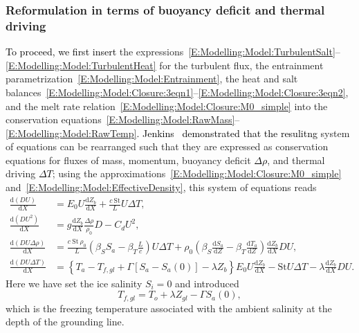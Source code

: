 \documentclass[openacc]{rsproca_new}%
\newcommand{\dd}[2]{\frac{\mathrm{d} #1}{\mathrm{d} #2}}
\newcommand{\red}[1]{{\color{red} #1}}
\newcommand{\blue}[1]{{\color{blue} #1}}
\newcommand{\rout}[1]{\red{\st{#1}}}\newcommand{\ab}[1]{\textcolor{Green}{#1}}\newcommand{\about}[1]{\textcolor{Cyan}{\sout{#1}}}
\renewcommand{\rout}[1]{{}} %
\renewcommand{\blue}[1]{{\textcolor{black}{#1}}} %
\renewcommand{\red}[1]{{}} %
\begin{document}
\subsubsection{Reformulation in terms of buoyancy deficit and thermal driving}
\blue{To proceed, we first insert}\rout{Inserting} the expressions~\eqref{E:Modelling:Model:TurbulentSalt}--\eqref{E:Modelling:Model:TurbulentHeat} for the turbulent flux, the entrainment parametrization~\eqref{E:Modelling:Model:Entrainment}, the heat and salt balances~\eqref{E:Modelling:Model:Closure:3eqn1}--\eqref{E:Modelling:Model:Closure:3eqn2}, and the melt rate relation~\eqref{E:Modelling:Model:Closure:M0_simple} into the conservation equations~\eqref{E:Modelling:Model:RawMass}--\eqref{E:Modelling:Model:RawTemp}\blue{. Jenkins~\cite{Jenkins2011JPhysOcean} demonstrated that the resulitng}\rout{gives a} system of equations \rout{that }can be rearranged such that they are expressed as conservation equations for fluxes of mass, momentum, buoyancy deficit \blue{$\Delta \rho$}, and thermal driving \blue{$\Delta T$}; using the approximations~\eqref{E:Modelling:Model:Closure:M0_simple} and~\eqref{E:Modelling:Model:EffectiveDensity}, this system of equations reads
\begin{align}
\dd{(DU)}{X} &= E_0 U \dd{Z_b}{X}+ \frac{c~\mathrm{St}}{L}U\Delta T,\label{E:Modelling:Model:Mass}\\
\dd{(DU^2)}{X} &= g \dd{Z_b}{X} \frac{\Delta \rho }{\rho_0} D - C_d U^2, \label{E:Modelling:Model:Mom}\\
\dd{(DU\Delta \rho)}{X} &= \frac{c~\mathrm{St}~\rho_0}{L}\left(\beta_S S_a - \beta_T \frac{L}{c}\right) U\Delta T + \rho_0\left(\beta_S \dd{S_a}{Z}-\beta_T \dd{T_a}{Z}\right) \dd{Z_b}{X} DU, \label{E:Modelling:Model:Buoyancy}\\
\dd{(DU\Delta T)}{X} &= \left\{T_a - T_{f,gl} + \Gamma \left[S_a - S_a(0)\right] - \lambda Z_b\right\}E_0 U \dd{Z_b}{X} - \mathrm{St}U \Delta T - \lambda \dd{Z_b}{X} DU.
\label{E:Modelling:Model:Thermal}
\end{align}
Here we have set the ice salinity $S_i = 0$ and introduced
\begin{equation}
T_{f,gl} = T_o + \lambda Z_{gl} - \Gamma S_a(0),
\end{equation}
which is the freezing temperature associated with the ambient salinity at the depth of the grounding line.
\end{document}
